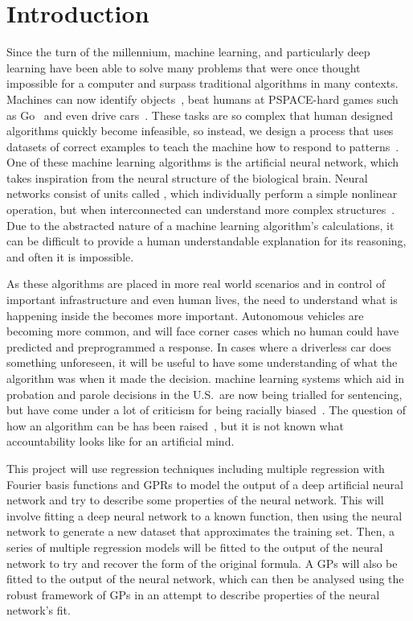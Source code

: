
\chapter{Introduction}

Since the turn of the millennium, machine learning, and particularly deep learning have been able to solve many problems that were once thought impossible for a computer and surpass traditional algorithms in many contexts.
Machines can now identify objects~\autocite{li2018}, beat humans at PSPACE-hard games such as Go~\autocite{chao2018} and even drive cars~\autocite{gerla2014}.
These tasks are so complex that human designed algorithms quickly become infeasible, so instead, we design a process that uses datasets of correct examples to teach the machine how to respond to patterns~\autocite[1]{murphy2012}.
One of these machine learning algorithms is the artificial neural network, which takes inspiration from the neural structure of the biological brain.
Neural networks consist of units called , which individually perform a simple nonlinear operation, but when interconnected can understand more complex structures~\autocite[436]{lecun2015}.
Due to the abstracted nature of a machine learning algorithm's calculations, it can be difficult to provide a human understandable explanation for its reasoning, and often it is impossible.

As these algorithms are placed in more real world scenarios and in control of important infrastructure and even human lives, the need to understand what is happening inside the  becomes more important.
Autonomous vehicles are becoming more common, and will face corner cases which no human could have predicted and preprogrammed a response.
In cases where a driverless car does something unforeseen, it will be useful to have some understanding of what the algorithm was  when it made the decision.
machine learning systems which aid in probation and parole decisions in the U.S.\ are now being trialled for sentencing, but have come under a lot of criticism for being racially biased~\autocite{christin2015}.
The question of how an algorithm can be  has been raised~\autocite[9]{christin2015}, but it is not known what accountability looks like for an artificial mind.

This project will use regression techniques including multiple regression with Fourier basis functions and \aclp{GPR} to model the output of a deep artificial neural network and try to describe some properties of the neural network.
This will involve fitting a deep neural network to a known function, then using the neural network to generate a new dataset that approximates the training set.
Then, a series of multiple regression models will be fitted to the output of the neural network to try and recover the form of the original formula.
A \aclp{GP} will also be fitted to the output of the neural network, which can then be analysed using the robust framework of \aclp{GP} in an attempt to describe properties of the neural network's fit.
